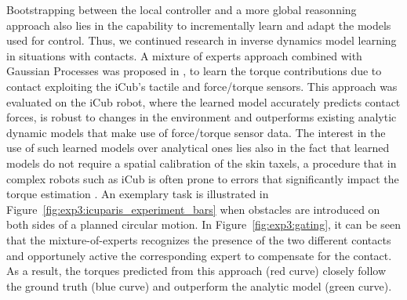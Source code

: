 \documentclass[final,5p,twocolumn]{elsarticle}
\begin{document}
Bootstrapping between the local controller and a more global reasonning approach also lies in the capability to incrementally learn and adapt the models used for control.
Thus, we continued research in inverse dynamics model learning in situations with contacts. A mixture of experts approach combined with
Gaussian Processes was proposed in \cite{Calandra_ICRA15}, to learn the torque contributions due to contact exploiting the iCub's tactile and force/torque sensors. This approach was evaluated on the iCub robot, where the learned model accurately predicts contact forces, is robust to changes in the environment and outperforms existing analytic dynamic models that make use of force/torque sensor data. The interest in the use of such learned models over analytical ones lies also in the fact that learned models do not require a spatial calibration of the skin taxels, a procedure that in complex robots such as iCub is often prone to errors that significantly impact the torque estimation \cite{DelPrete2011}.
An exemplary task is illustrated in Figure~\ref{fig:exp3:icuparis_experiment_bars} 
when obstacles are introduced on both sides of a planned circular motion.
In Figure~\ref{fig:exp3:gating}, it can be seen that the mixture-of-experts recognizes the presence of the two different contacts and opportunely active the corresponding expert to compensate for the contact.
As a result, the torques predicted from this approach (red curve) closely follow the ground truth (blue curve) and outperform the analytic model (green curve).
\end{document}
